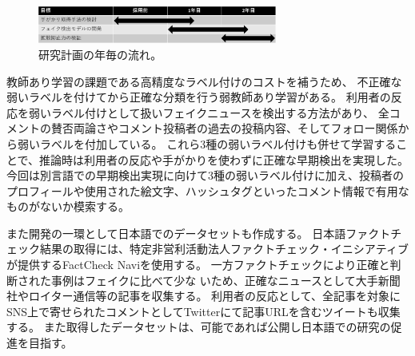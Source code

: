 \setlength\intextsep{0pt}
\setlength\textfloatsep{0pt}
\begin{figure}
    \centering
    \includegraphics[width=0.7\textwidth]{figs/plan.pdf}
    \vspace{-1cm} 
    \caption{研究計画の年毎の流れ。}
    \label{fig:plan}
\end{figure}
教師あり学習の課題である高精度なラベル付けのコストを補うため、
不正確な弱いラベルを付けてから正確な分類を行う弱教師あり学習がある。
利用者の反応を弱いラベル付けとして扱いフェイクニュースを検出する方法があり\cite{shu2020leveraging}、
全コメントの賛否両論さやコメント投稿者の過去の投稿内容、そしてフォロー関係から弱いラベルを付加している。
これら3種の弱いラベル付けも併せて学習することで、推論時は利用者の反応や手がかりを使わずに正確な早期検出を実現した。
今回は別言語での早期検出実現に向けて3種の弱いラベル付けに加え、投稿者のプロフィールや使用された絵文字、ハッシュタグといったコメント情報で有用なものがないか模索する。

また開発の一環として日本語でのデータセットも作成する。
日本語ファクトチェック結果の取得には、特定非営利活動法人ファクトチェック・イニシアティブが提供するFactCheck Naviを使用する。
一方ファクトチェックにより正確と判断された事例はフェイクに比べて少な%
いため、正確なニュースとして大手新聞社やロイター通信等の記事を収集する。
利用者の反応として、全記事を対象にSNS上で寄せられたコメントとしてTwitterにて記事URLを含むツイートも収集する。
また取得したデータセットは、可能であれば公開し日本語での研究の促進を目指す。

